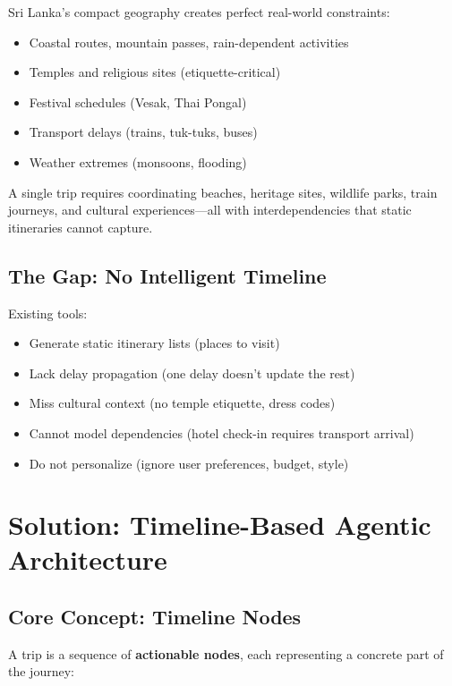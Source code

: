\documentclass[11pt]{article}
\begin{document}
Sri Lanka's compact geography creates perfect real-world constraints:
\begin{itemize}
    \item Coastal routes, mountain passes, rain-dependent activities
    \item Temples and religious sites (etiquette-critical)
    \item Festival schedules (Vesak, Thai Pongal)
    \item Transport delays (trains, tuk-tuks, buses)
    \item Weather extremes (monsoons, flooding)
\end{itemize}

A single trip requires coordinating beaches, heritage sites, wildlife parks, train journeys, and cultural experiences—all with interdependencies that static itineraries cannot capture.

\subsection{The Gap: No Intelligent Timeline}

Existing tools:
\begin{itemize}
    \item Generate static itinerary lists (places to visit)
    \item Lack delay propagation (one delay doesn't update the rest)
    \item Miss cultural context (no temple etiquette, dress codes)
    \item Cannot model dependencies (hotel check-in requires transport arrival)
    \item Do not personalize (ignore user preferences, budget, style)
\end{itemize}

\section{Solution: Timeline-Based Agentic Architecture}

\subsection{Core Concept: Timeline Nodes}

A trip is a sequence of \textbf{actionable nodes}, each representing a concrete part of the journey:
\end{document}
